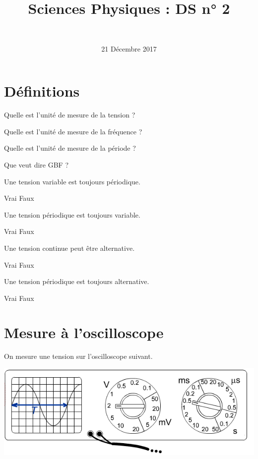 \documentclass[a4paper,11pt]{exam}
\author{\ }
\date{21 Décembre 2017}
\title{Sciences Physiques : DS n° 2}
\begin{document}
%	

	\maketitle
\vspace*{-0.5cm}	
\section{Définitions}


\begin{questions}
	\question Quelle est l'unité de mesure de la tension ?
	\fillwithdottedlines{1cm}
	
	\question Quelle est l'unité de mesure de la fréquence ?
	\fillwithdottedlines{1cm}
	
	\question Quelle est l'unité de mesure de la période ?
	\fillwithdottedlines{1cm}
	
	\question Que veut dire GBF ?
	\fillwithdottedlines{1cm}
	
	\question Une tension variable est toujours périodique.
	\begin{oneparcheckboxes}
		\choice Vrai
		\choice Faux
	\end{oneparcheckboxes}

	\question Une tension périodique est toujours variable.
	\begin{oneparcheckboxes}
		\choice Vrai
		\choice Faux
	\end{oneparcheckboxes}
	
	\question Une tension continue peut être alternative.
	\begin{oneparcheckboxes}
		\choice Vrai
		\choice Faux
	\end{oneparcheckboxes}

	\question Une tension périodique est toujours alternative.
	\begin{oneparcheckboxes}
		\choice Vrai
		\choice Faux
	\end{oneparcheckboxes}
	
\end{questions}

\section{Mesure à l'oscilloscope}

On mesure une tension sur l'oscilloscope suivant.

\begin{center}
	\includegraphics[scale=0.8]{img/oscillo}
\end{center}
\end{document}
